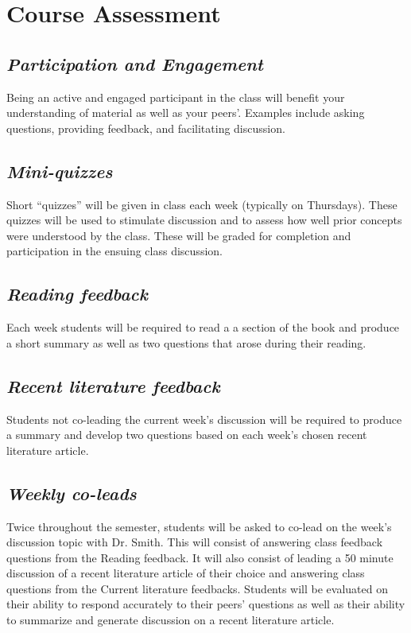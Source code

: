 \documentclass[12pt, notitlepage]{article}   	%
\begin{document}
{\section{Course Assessment}
\subsection{\textit{Participation and Engagement}}
Being an active and engaged participant in the class will benefit your understanding
of material as well as your peers'. Examples include asking questions, providing feedback,
and facilitating discussion.

\subsection{\textit{Mini-quizzes}}
Short “quizzes” will be given in class each week (typically on Thursdays). 
These quizzes will be used to stimulate discussion and to assess how well 
prior concepts were understood by the class. 
These will be graded for completion and participation in the ensuing class discussion.

\subsection{\textit{Reading feedback}}
Each week students will be required to read a a section of the book 
and produce a short summary as well as two questions that arose during their 
reading.

\subsection{\textit{Recent literature feedback}}
Students not co-leading the current week’s 
discussion will be required to produce a summary and 
develop two questions based on each week’s chosen recent literature article.

\subsection{\textit{Weekly co-leads}}
Twice throughout the semester, students will be asked to co-lead on the week's discussion
topic with Dr. Smith. This will consist of answering class feedback questions from the
Reading feedback. It will also consist of leading a 50 minute discussion of a recent literature article
of their choice and answering class questions from the Current literature feedbacks.
Students will be evaluated on their ability to respond accurately to their peers' questions
as well as their ability to summarize and generate discussion on a recent literature article.

}
\end{document}
